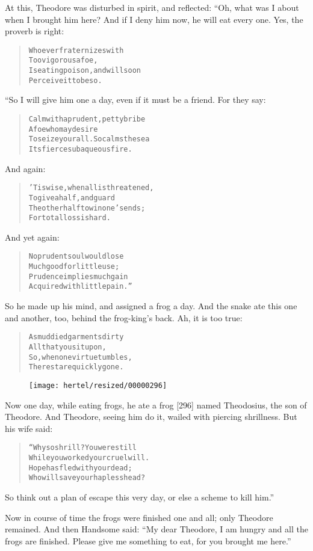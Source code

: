 \documentclass[article, twoside, 10pt]{memoir}
\renewenvironment{verbatim}{%
\begin{quote}%
\vskip -10pt%
\begin{alltt}\normalfont\small}{\end{alltt}%
\end{quote}%
\vskip -10pt
} %
\begin{document}
At this, Theodore was disturbed in spirit, and reflected: “Oh, what
was I about when I brought him here? And if I deny him now, he will
eat every one. Yes, the proverb is right:

\begin{verbatim}
Whoever fraternizes with
    Too vigorous a foe,
Is eating poison, and will soon
    Perceive it to be so.
\end{verbatim}
“So I will give him one a day, even if it must be a friend. For
they say:

\begin{verbatim}
Calm with a prudent, petty bribe
    A foe who may desire
To seize your all. So calms the sea
    Its fierce subaqueous fire.
\end{verbatim}
And again:

\begin{verbatim}
'Tis wise, when all is threatened,
    To give a half, and guard
The other half to win one's ends;
    For total loss is hard.
\end{verbatim}
And yet again:

\begin{verbatim}
No prudent soul would lose
Much good for little use;
Prudence implies much gain
Acquired with little pain.”
\end{verbatim}
So he made up his mind, and assigned a frog a day. And the snake
ate this one and another, too, behind the frog-king's back. Ah, it
is too true:

\begin{verbatim}
As muddied garments dirty
    All that you sit upon,
So, when one virtue tumbles,
    The rest are quickly gone.
\end{verbatim}
\begin{figure}[p]\texttt{[image: hertel/resized/00000296]}\end{figure}Now one day, while eating frogs, he ate a frog [296] named
Theodosius, the son of Theodore. And Theodore, seeing him do it,
wailed with piercing shrillness. But his wife said:

\begin{verbatim}
“Why so shrill? You were still
While you worked your cruel will.
Hope has fled with your dead;
Who will save your hapless head?
\end{verbatim}
So think out a plan of escape this very day, or else a scheme to
kill him.”

Now in course of time the frogs were finished one and all; only
Theodore remained. And then Handsome said:
``My dear Theodore, I am hungry and all the frogs are finished. Please give me something to eat, for you brought me here.''
\end{document}

